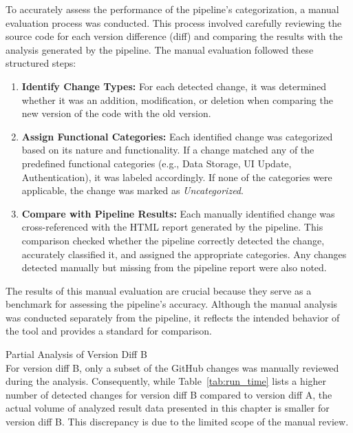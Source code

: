 To accurately assess the performance of the pipeline’s categorization, a manual evaluation process was conducted. This process involved carefully reviewing the source code for each version difference (diff) and comparing the results with the analysis generated by the pipeline. The manual evaluation followed these structured steps:

\begin{enumerate}
    \item \textbf{Identify Change Types:} For each detected change, it was determined whether it was an addition, modification, or deletion when comparing the new version of the code with the old version.

    \item \textbf{Assign Functional Categories:} Each identified change was categorized based on its nature and functionality. If a change matched any of the predefined functional categories (e.g., Data Storage, UI Update, Authentication), it was labeled accordingly. If none of the categories were applicable, the change was marked as \textit{Uncategorized}.

    \item \textbf{Compare with Pipeline Results:} Each manually identified change was cross-referenced with the HTML report generated by the pipeline. This comparison checked whether the pipeline correctly detected the change, accurately classified it, and assigned the appropriate categories. Any changes detected manually but missing from the pipeline report were also noted.
\end{enumerate}

The results of this manual evaluation are crucial because they serve as a benchmark for assessing the pipeline's accuracy. Although the manual analysis was conducted separately from the pipeline, it reflects the intended behavior of the tool and provides a standard for comparison. 

\begin{note}
    Partial Analysis of Version Diff B\\
    \noindent
    For version diff B, only a subset of the GitHub changes was manually reviewed during the analysis. Consequently, while Table~\ref{tab:run_time} lists a higher number of detected changes for version diff B compared to version diff A, the actual volume of analyzed result data presented in this chapter is smaller for version diff B. This discrepancy is due to the limited scope of the manual review.
\end{note}



